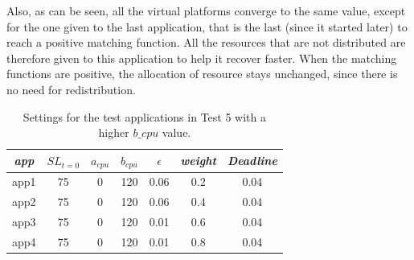 \documentclass[nobiblatex]{LTHthesis}
\begin{document}
Also, as can be seen, all the virtual platforms converge to the same value,
except for the one given to the last application, that is the last 
(since it started later) to reach a positive matching function. 
All the resources that are not distributed are therefore given to this
application to help it recover faster. When the matching functions are
positive, the allocation of resource stays unchanged, since there is no need
for redistribution.

\begin{table}[h]
  \centering
  \begin{tabular}{|c|c|c|c|c|c|c|}
  \hline 
   \emph{app} & $SL_{t=0}$ & \textbf{$a_{cpu}$} & \textbf{$b_{cpu}$} & \textbf{$\epsilon$} & \emph{weight} & \emph{Deadline} \\ \hline
  app1 & 75 & 0 & 120 & 0.06 & 0.2 &0.04  \\ \hline
  app2 & 75 & 0 & 120 & 0.06 & 0.4 &0.04  \\ \hline
  app3 & 75 & 0 & 120 & 0.01 & 0.6 &0.04  \\ \hline
  app4 & 75 & 0 & 120 & 0.01 & 0.8 &0.04  \\ \hline        
  \end{tabular}
  \caption{Settings for the test applications in Test 5
    with a higher $b\_cpu$ value.}
  \label{tab:settings_test5b}
\end{table}
\end{document}
